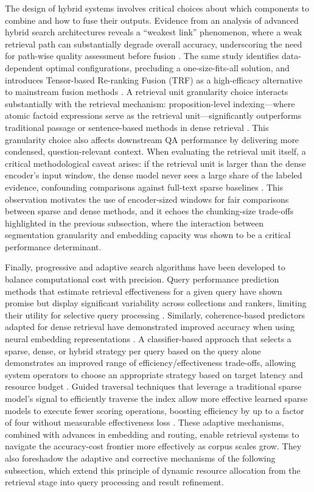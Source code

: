\documentclass[11pt]{article}
\begin{document}
The design of hybrid systems involves critical choices about which components to combine and how to fuse their outputs. Evidence from an analysis of advanced hybrid search architectures reveals a ``weakest link'' phenomenon, where a weak retrieval path can substantially degrade overall accuracy, underscoring the need for path-wise quality assessment before fusion \cite{ref117}. The same study identifies data-dependent optimal configurations, precluding a one-size-fits-all solution, and introduces Tensor-based Re-ranking Fusion (TRF) as a high-efficacy alternative to mainstream fusion methods \cite{ref117}. A retrieval unit granularity choice interacts substantially with the retrieval mechanism: proposition-level indexing---where atomic factoid expressions serve as the retrieval unit---significantly outperforms traditional passage or sentence-based methods in dense retrieval \cite{ref118}. This granularity choice also affects downstream QA performance by delivering more condensed, question-relevant context. When evaluating the retrieval unit itself, a critical methodological caveat arises: if the retrieval unit is larger than the dense encoder's input window, the dense model never sees a large share of the labeled evidence, confounding comparisons against full-text sparse baselines \cite{ref115}. This observation motivates the use of encoder-sized windows for fair comparisons between sparse and dense methods, and it echoes the chunking-size trade-offs highlighted in the previous subsection, where the interaction between segmentation granularity and embedding capacity was shown to be a critical performance determinant.

Finally, progressive and adaptive search algorithms have been developed to balance computational cost with precision. Query performance prediction methods that estimate retrieval effectiveness for a given query have shown promise but display significant variability across collections and rankers, limiting their utility for selective query processing \cite{ref119}. Similarly, coherence-based predictors adapted for dense retrieval have demonstrated improved accuracy when using neural embedding representations \cite{ref120}. A classifier-based approach that selects a sparse, dense, or hybrid strategy per query based on the query alone demonstrates an improved range of efficiency/effectiveness trade-offs, allowing system operators to choose an appropriate strategy based on target latency and resource budget \cite{ref121}. Guided traversal techniques that leverage a traditional sparse model's signal to efficiently traverse the index allow more effective learned sparse models to execute fewer scoring operations, boosting efficiency by up to a factor of four without measurable effectiveness loss \cite{ref122}. These adaptive mechanisms, combined with advances in embedding and routing, enable retrieval systems to navigate the accuracy-cost frontier more effectively as corpus scales grow. They also foreshadow the adaptive and corrective mechanisms of the following subsection, which extend this principle of dynamic resource allocation from the retrieval stage into query processing and result refinement.
\end{document}
